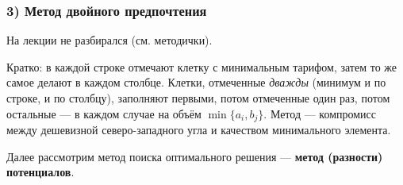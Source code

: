 \subsubsection*{3) Метод двойного предпочтения}

На лекции не разбирался (см. методички).

\begin{idea}
Кратко: в каждой строке отмечают клетку с минимальным тарифом, затем то же самое
делают в каждом столбце. Клетки, отмеченные \emph{дважды} (минимум и по строке,
и по столбцу), заполняют первыми, потом отмеченные один раз, потом остальные —
в каждом случае на объём $\min\{a_i, b_j\}$. Метод — компромисс между дешевизной
северо-западного угла и качеством минимального элемента.
\end{idea}

Далее рассмотрим метод поиска оптимального решения — \textbf{метод (разности)
потенциалов}.
